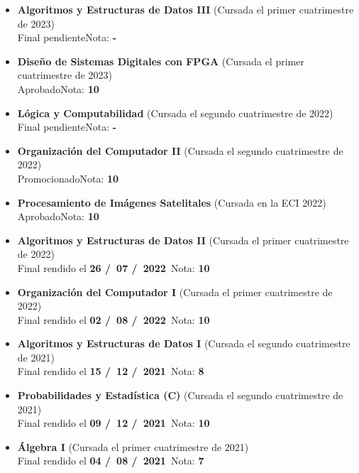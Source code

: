 \begin{itemize}[leftmargin=0.8cm]

  \item{\textbf{Algoritmos y Estructuras de Datos III} (Cursada el primer cuatrimestre de 2023)\\
  Final pendiente\hfill Nota: \textbf{-}}

  \item{\textbf{Diseño de Sistemas Digitales con FPGA} (Cursada el primer cuatrimestre de 2023)\\
  Aprobado\hfill Nota: \textbf{10}}

  \item{\textbf{Lógica y Computabilidad} (Cursada el segundo cuatrimestre de 2022)\\
  Final pendiente\hfill Nota: \textbf{-}}

  \item{\textbf{Organización del Computador II} (Cursada el segundo cuatrimestre de 2022)\\
  Promocionado\hfill Nota: \textbf{10}}

  \item{\textbf{Procesamiento de Imágenes Satelitales} (Cursada en la ECI 2022)\\
  Aprobado\hfill Nota: \textbf{10}}

  \item{\textbf{Algoritmos y Estructuras de Datos II} (Cursada el primer cuatrimestre de 2022)\\
  Final rendido el \textbf{26 \slash \ 07 \slash \ 2022}\ \hfill Nota: \textbf{10}}

  \item{\textbf{Organización del Computador I} (Cursada el primer cuatrimestre de 2022)\\
  Final rendido el \textbf{02 \slash \ 08 \slash \ 2022}\ \hfill Nota: \textbf{10}}

  \item{\textbf{Algoritmos y Estructuras de Datos I} (Cursada el segundo cuatrimestre de 2021)\\
  Final rendido el \textbf{15 \slash \ 12 \slash \ 2021}\ \hfill Nota: \textbf{8}}

  \item{\textbf{Probabilidades y Estadística (C)} (Cursada el segundo cuatrimestre de 2021)\\
  Final rendido el \textbf{09 \slash \ 12 \slash \ 2021}\ \hfill Nota: \textbf{10}}

  \item{\textbf{Álgebra I} (Cursada el primer cuatrimestre de 2021)\\
  Final rendido el \textbf{04 \slash \ 08 \slash \ 2021}\ \hfill Nota: \textbf{7}}


\end{itemize}
